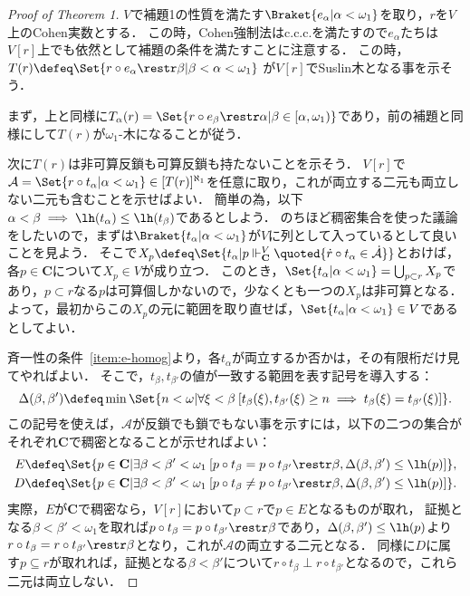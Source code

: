 \documentclass[a4j]{ltjsarticle}
\begin{document}
\begin{proof}[Proof of Theorem 1]
 $V$で補題1の性質を満たす$\Braket{e_\alpha | \alpha < \omega_1}$を取り，$r$を$V$上のCohen実数とする．
 この時，Cohen強制法はc.c.c.を満たすので$e_\alpha$たちは$V[r]$上でも依然として補題の条件を満たすことに注意する．
 この時，$T(r) \defeq \Set{r \circ e_\alpha \restr \beta | \beta < \alpha < \omega_1}$ が$V[r]$でSuslin木となる事を示そう．

 まず，上と同様に$T_\alpha(r) = \Set{ r \circ e_\beta \restr \alpha | \beta \in [\alpha, \omega_1)}$であり，前の補題と同様にして$T(r)$が$\omega_1$-木になることが従う．

 次に$T(r)$は非可算反鎖も可算反鎖も持たないことを示そう．
 $V[r]$で$\mathcal{A} = \Set{ r \circ t_\alpha | \alpha < \omega_1} \in [T(r)]^{\aleph_1}$を任意に取り，これが両立する二元も両立しない二元も含むことを示せばよい．
 簡単の為，以下$\alpha < \beta \implies \lh(t_\alpha) \leq \lh(t_\beta)$であるとしよう．
 のちほど稠密集合を使った議論をしたいので，まずは$\Braket{t_\alpha | \alpha < \omega_1}$が$V$に列として入っているとして良いことを見よう．
 そこで$X_p \defeq \Set{t_\alpha | p \Vdash^{V}_{\mathbf{C}} \quoted{\dot{r} \circ t_\alpha \in \dot{\mathcal{A}}}}$とおけば，各$p \in \mathbf{C}$について$X_p \in V$が成り立つ．
 このとき，$\Set{t_\alpha | \alpha < \omega_1} = \bigcup_{p \subset r} X_p$であり，$p \subset r$なる$p$は可算個しかないので，少なくとも一つの$X_p$は非可算となる．
 よって，最初からこの$X_p$の元に範囲を取り直せば，$\Set{t_\alpha | \alpha < \omega_1} \in V$であるとしてよい．

 
 斉一性の条件~\ref{item:e-homog}より，各$t_\alpha$が両立するか否かは，その有限桁だけ見てやればよい．
 そこで，$t_\beta, t_{\beta'}$の値が一致する範囲を表す記号を導入する：
 \[
  \Delta(\beta, \beta') \defeq \min\Set{ n < \omega | \forall \xi < \beta \: [t_\beta(\xi), t_{\beta'}(\xi) \geq n \implies t_\beta(\xi) = t_{\beta'}(\xi)]}.
 \]
 この記号を使えば，$\mathcal{A}$が反鎖でも鎖でもない事を示すには，以下の二つの集合がそれぞれ$\mathbf{C}$で稠密となることが示せればよい：
 \begin{align*}
  E &\defeq \Set{p \in \mathbf{C} | \exists \beta < \beta' < \omega_1 \: [p \circ t_\beta = p \circ t_{\beta'} \restr \beta, \Delta(\beta, \beta') \leq \lh(p)] },\\
  D &\defeq \Set{p \in \mathbf{C} | \exists \beta < \beta' < \omega_1 \: [p \circ t_\beta \neq p \circ t_{\beta'} \restr \beta, \Delta(\beta, \beta') \leq \lh(p)]}.
 \end{align*}
 実際，$E$が$\mathbf{C}$で稠密なら，$V[r]$において$p \subset r$で$p \in E$となるものが取れ，
 証拠となる$\beta < \beta' < \omega_1$を取れば$p \circ t_\beta = p \circ t_{\beta'} \restr \beta$であり，$\Delta(\beta, \beta') \leq \lh(p)$より$r \circ t_\beta = r \circ t_{\beta'} \restr \beta$となり，これが$\mathcal{A}$の両立する二元となる．
 同様に$D$に属す$p \subseteq r$が取れれば，証拠となる$\beta < \beta'$について$r \circ t_{\beta} \perp r \circ t_{\beta'}$となるので，これら二元は両立しない．


\end{proof}
\end{document}
